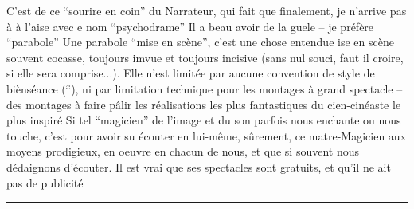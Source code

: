 C'est de   ce ``sourire en coin'' du Narrateur, qui fait
que finalement, je  n'arrive pas à   à l'aise
avec  e nom ``psychodrame''\handwritten{,}  Il a beau avoir de
la guele -- je préfère   ``parabole'' 
Une parabole  ``mise en scène'', c'est une chose entendue\handwritten{,}  
 ise en scène souvent cocasse, toujours imvue et toujours incisive
(sans nul souci, faut il croire, si elle sera comprise...). Elle n'est
limitée par aucune convention\handwritten{,} de style  de biènséance ($^{x}$), ni par 
limitation technique pour les montages à grand spectacle -- des montages
à faire pâlir les réalisations les plus fantastiques du cien-cinéaste
le plus inspiré\handwritten{!} Si tel ``magicien'' de l'image et  du son parfois nous enchante
ou nous touche, c'est pour avoir su écouter en lui-même, sûrement,
ce matre-Magicien aux moyens prodigieux, en oeuvre en chacun de nous, et
que si souvent nous dédaignons d'écouter. Il est vrai que ses spectacles
sont gratuits, et qu'il ne ait pas de publicité

\noindent\rule{.23\linewidth}{.3pt}

